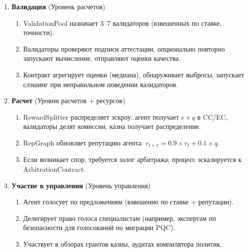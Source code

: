 \documentclass[11pt]{article}
\begin{document}
\begin{enumerate}
\begin{enumerate}[label=\alph*.]
    \end{enumerate}
  \item \textbf{Валидация} (Уровень расчетов)
    \begin{enumerate}[label=\alph*.]
      \item ValidationPool назначает 3--7 валидаторов (взвешенных по ставке, точности).
      \item Валидаторы проверяют подписи аттестации, опционально повторно запускают вычисление, отправляют оценки качества.
      \item Контракт агрегирует оценки (медиана), обнаруживает выбросы, запускает слэшинг при неправильном поведении валидаторов.
    \end{enumerate}
  \item \textbf{Расчет} (Уровни расчетов + ресурсов)
    \begin{enumerate}[label=\alph*.]
      \item RewardSplitter распределяет эскроу: агент получает $e \times q$ в CC/EC, валидаторы делят комиссии, казна получает распределение.
      \item RepGraph обновляет репутацию агента: $r_{t+1} = 0.9 \times r_t + 0.1 \times q$.
      \item Если возникает спор, требуется залог арбитража; процесс эскалируется к ArbitrationContract.
    \end{enumerate}
  \item \textbf{Участие в управлении} (Уровень управления)
    \begin{enumerate}[label=\alph*.]
      \item Агент голосует по предложениям (взвешенно по ставке + репутации).
      \item Делегирует право голоса специалистам (например, экспертам по безопасности для голосований по миграции PQC).
      \item Участвует в обзорах грантов казны, аудитах компилятора политик.
    \end{enumerate}
\end{enumerate}
\end{document}
